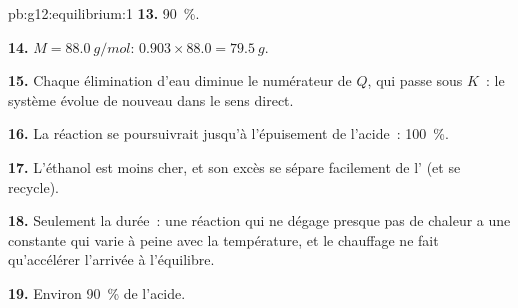\begin{solution}{pb:g12:equilibrium:1}
\textbf{13.} \qty{90}{\percent}.

\textbf{14.} $M = \qty{88.0}{g/mol}$: $0.903 \times 88.0 = \qty{79.5}{g}$.

\textbf{15.} Chaque élimination d'eau diminue le numérateur de $Q$, qui
passe sous $K$~: le système évolue de nouveau dans le sens direct.

\textbf{16.} La réaction se poursuivrait jusqu'à l'épuisement de
l'acide~: \qty{100}{\percent}.

\textbf{17.} L'éthanol est moins cher, et son excès se sépare facilement
de l' (et se recycle).

\textbf{18.} Seulement la durée~: une réaction qui ne dégage presque pas
de chaleur a une constante qui varie à peine avec la température, et le
chauffage ne fait qu'accélérer l'arrivée à l'équilibre.

\textbf{19.} Environ \qty{90}{\percent} de l'acide.
\end{solution}
